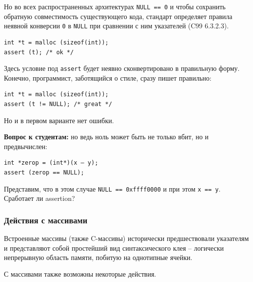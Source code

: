 \documentclass[a4paper,12pt,oneside]{article}
\newif\ifanswers
\begin{document}
Но во всех распространенных архитектурах \lstinline!NULL == 0! и чтобы сохранить обратную совместимость существующего кода, стандарт определяет правила неявной конверсии \lstinline!0! в \lstinline!NULL! при сравнении с ним указателей (C99 6.3.2.3).

\begin{lstlisting}
int *t = malloc (sizeof(int));
assert (t); /* ok */
\end{lstlisting}

Здесь условие под \lstinline!assert! будет неявно сконвертировано в правильную форму. Конечно, программист, заботящийся о стиле, сразу пишет правильно:

\begin{lstlisting}
int *t = malloc (sizeof(int));
assert (t != NULL); /* great */
\end{lstlisting}

Но и в первом варианте нет ошибки.

\textbf{Вопрос к студентам:} но ведь ноль может быть не только вбит, но и предвычислен:

\begin{lstlisting}
int *zerop = (int*)(x – y);
assert (zerop == NULL);
\end{lstlisting}

Представим, что в этом случае \lstinline!NULL == 0xffff0000! и при этом \lstinline!x == y!. Сработает ли assertion?

\ifanswers
Правильный ответ: увы, нет. Стандарт гарантирует стабильное обращение с нулями времени компиляции, но не нулями времени исполнения (C99 6.3.2.3), иначе проверками пришлось бы завешивать слишком много кода.
\fi

\subsubsection{Действия с массивами}

Встроенные массивы (также C-массивы) исторически предшествовали указателям и представляют собой простейший вид синтаксического клея -- логически непрерывную область памяти, побитую на однотипные ячейки.

С массивами также возможны некоторые действия.
\end{document}
